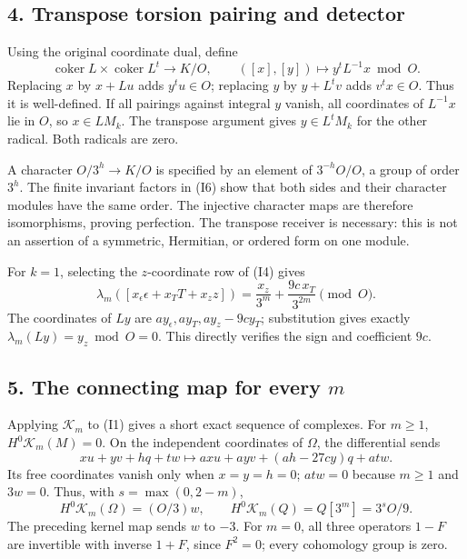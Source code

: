 \documentclass[
  10pt,
]{article}
\begin{document}
\subsection{4. Transpose torsion pairing and
detector}\label{transpose-torsion-pairing-and-detector}

Using the original coordinate dual, define \[
\operatorname{coker}L\times\operatorname{coker}L^t\to K/O,\qquad
([x],[y])\longmapsto y^tL^{-1}x\bmod O. \tag{I7}
\] Replacing \(x\) by \(x+Lu\) adds \(y^tu\in O\); replacing \(y\) by
\(y+L^tv\) adds \(v^tx\in O\). Thus it is well-defined. If all pairings
against integral \(y\) vanish, all coordinates of \(L^{-1}x\) lie in
\(O\), so \(x\in LM_k\). The transpose argument gives \(y\in L^tM_k\)
for the other radical. Both radicals are zero.

A character \(O/3^h\to K/O\) is specified by an element of
\(3^{-h}O/O\), a group of order \(3^h\). The finite invariant factors in
(I6) show that both sides and their character modules have the same
order. The injective character maps are therefore isomorphisms, proving
perfection. The transpose receiver is necessary: this is not an
assertion of a symmetric, Hermitian, or ordered form on one module.

For \(k=1\), selecting the \(z\)-coordinate row of (I4) gives \[
\lambda_m([x_\epsilon\epsilon+x_TT+x_zz])
=\frac{x_z}{3^m}+\frac{9c\,x_T}{3^{2m}}\pmod O. \tag{I8}
\] The coordinates of \(Ly\) are \(a y_\epsilon,a y_T,a y_z-9cy_T\);
substitution gives exactly \(\lambda_m(Ly)=y_z\bmod O=0\). This directly
verifies the sign and coefficient \(9c\).

\subsection{\texorpdfstring{5. The connecting map for every
\(m\)}{5. The connecting map for every m}}\label{the-connecting-map-for-every-m}

Applying \(\mathcal K_m\) to (I1) gives a short exact sequence of
complexes. For \(m\ge1\), \(H^0\mathcal K_m(M)=0\). On the independent
coordinates of \(\Omega\), the differential sends \[
xu+yv+hq+tw\longmapsto
axu+ayv+(ah-27cy)q+atw.
\] Its free coordinates vanish only when \(x=y=h=0\); \(atw=0\) because
\(m\ge1\) and \(3w=0\). Thus, with \(s=\max(0,2-m)\), \[
H^0\mathcal K_m(\Omega)=(O/3)w,\qquad
H^0\mathcal K_m(Q)=Q[3^m]=3^sO/9. \tag{I9}
\] The preceding kernel map sends \(w\) to \(-3\). For \(m=0\), all
three operators \(1-F\) are invertible with inverse \(1+F\), since
\(F^2=0\); every cohomology group is zero.
\end{document}
